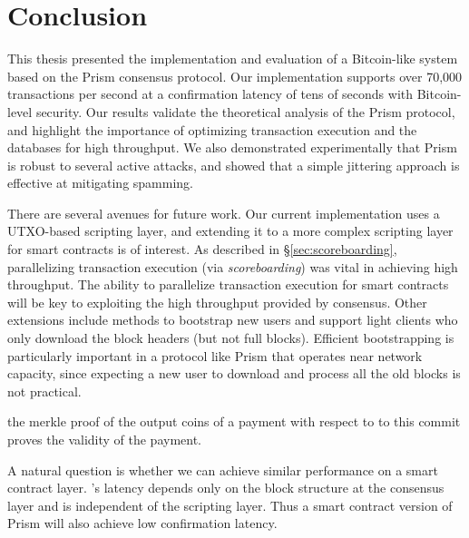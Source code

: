 \chapter{Conclusion}
\label{sec:conclusion}

This thesis presented the implementation and evaluation of a Bitcoin-like system based on the Prism consensus protocol. Our implementation supports over 70,000 transactions per second at a confirmation latency of tens of seconds with Bitcoin-level security. Our results validate the theoretical analysis of the Prism protocol, and highlight the importance of optimizing transaction execution and the databases for high throughput.   We also demonstrated experimentally that Prism is robust to several active attacks, and showed that a simple jittering approach is effective at mitigating spamming. 

There are several avenues for future work. Our current implementation uses a UTXO-based scripting layer, and extending it to a more complex scripting layer for smart contracts is of interest.  As described in \S\ref{sec:scoreboarding}, parallelizing transaction execution (via \textit{scoreboarding}) was vital in achieving high throughput. The ability to parallelize transaction execution for smart contracts will  be  key to exploiting the high throughput provided by \prism consensus. Other extensions include methods to bootstrap new users and support light clients who only download the block headers (but not full blocks). Efficient bootstrapping is particularly important in a protocol like Prism that operates near network capacity, since expecting a new user to download and process all the old blocks is not practical. 


the merkle proof of the output coins of a payment with respect to to this commit proves the validity of the payment. 

 A natural question is whether we can achieve similar performance on a smart contract layer. 
 \prism's latency depends only on the block structure at the consensus layer and is independent of the scripting layer. Thus a smart contract version of Prism will also achieve low confirmation latency. 

